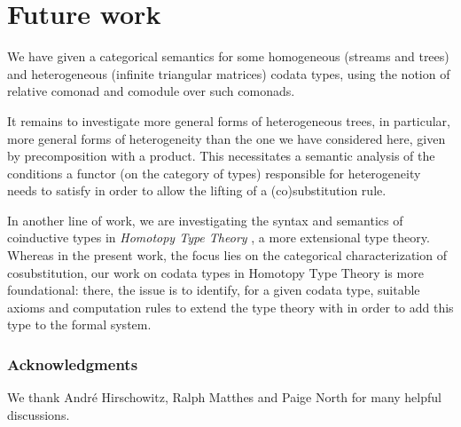 \documentclass[a4paper,USenglish]{lipics}
\begin{document}
\begin{Long}
\begin{comment}
The codata types specified via this \coq mechanism are stronger than those given by the axioms we consider.
More precisely, we prove the axioms of \Cref{tri_rules} from the above declaration of \lstinline!CoInductive Tri! and
\lstinline!CoInductive bisim!, and similar for streams.


This might be the right moment to point to work on a device allowing the declaration of coinductive types via destructors in \agda, 
see \parencite{DBLP:conf/popl/AbelPTS13}.
\end{comment}

\end{Long}

\section{Future work}

We have given a categorical semantics for some homogeneous (streams and trees) and heterogeneous (infinite triangular matrices) codata types,
using the notion of relative comonad and comodule over such comonads.

It remains to investigate more general forms of heterogeneous trees, in particular, more general forms of heterogeneity than the one we have
considered here, given by precomposition with a product.
This necessitates a semantic analysis of the conditions a functor (on the category of types) responsible for heterogeneity needs to satisfy in order to allow the lifting of a (co)substitution rule.

In another line of work, we are investigating the syntax and semantics of coinductive types in \emph{Homotopy Type Theory} \parencite{hottbook},
a more extensional type theory.
Whereas in the present work, the focus lies on the categorical characterization of cosubstitution, our work on codata types in Homotopy Type Theory is more foundational:
there, the issue is to identify, for a given codata type, suitable axioms and computation rules to extend the type theory with in order to add this type to the formal system.

 

\begin{Long}
 
\subsubsection*{Acknowledgments}
 We thank André Hirschowitz, Ralph Matthes and Paige North for many helpful discussions.

\end{Long}
 
\printbibliography



% 
% 
% 
\end{document}
